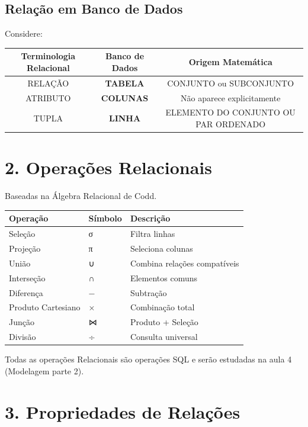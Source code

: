 \documentclass[
]{book}
\begin{document}
\subsection{Relação em Banco de Dados}\label{relauxe7uxe3o-em-banco-de-dados}

Considere:

\begin{longtable}[]{@{}ccc@{}}
\toprule\noalign{}
Terminologia Relacional & Banco de Dados & Origem Matemática \\
\midrule\noalign{}
\endhead
\bottomrule\noalign{}
\endlastfoot
RELAÇÃO & \textbf{TABELA} & CONJUNTO ou SUBCONJUNTO \\
ATRIBUTO & \textbf{COLUNAS} & Não aparece explicitamente \\
TUPLA & \textbf{LINHA} & ELEMENTO DO CONJUNTO OU PAR ORDENADO \\
\end{longtable}

\section{2. Operações Relacionais}\label{operauxe7uxf5es-relacionais}

Baseadas na Álgebra Relacional de Codd.

\begin{longtable}[]{@{}lll@{}}
\toprule\noalign{}
Operação & Símbolo & Descrição \\
\midrule\noalign{}
\endhead
\bottomrule\noalign{}
\endlastfoot
Seleção & σ & Filtra linhas \\
Projeção & π & Seleciona colunas \\
União & ∪ & Combina relações compatíveis \\
Interseção & ∩ & Elementos comuns \\
Diferença & − & Subtração \\
Produto Cartesiano & × & Combinação total \\
Junção & ⋈ & Produto + Seleção \\
Divisão & ÷ & Consulta universal \\
\end{longtable}

Todas as operações Relacionais são operações SQL e serão estudadas na aula 4 (Modelagem parte 2).

\section{3. Propriedades de Relações}\label{propriedades-de-relauxe7uxf5es}
\end{document}
